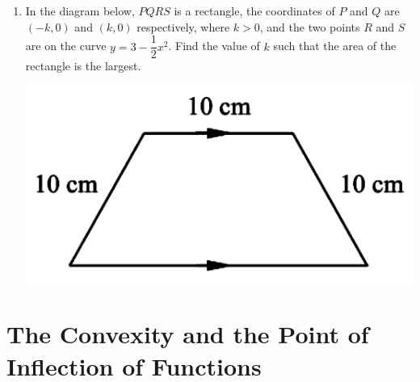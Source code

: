 \documentclass{report}
\begin{document}
\begin{enumerate}
\begin{center}
          \end{center}
    \item In the diagram below, $PQRS$ is a rectangle, the coordinates of $P$ and $Q$ are
          $(-k, 0)$ and $(k, 0)$ respectively, where $k > 0$, and the two points $R$ and
          $S$ are on the curve $y = 3- \dfrac{1}{2}x^2$. Find the value of $k$ such that
          the area of the rectangle is the largest.
          \begin{center}
              \includegraphics[scale=0.25]{assets/26-11.png}
          \end{center}
\end{enumerate}

\section{The Convexity and the Point of Inflection of Functions}
\end{document}
